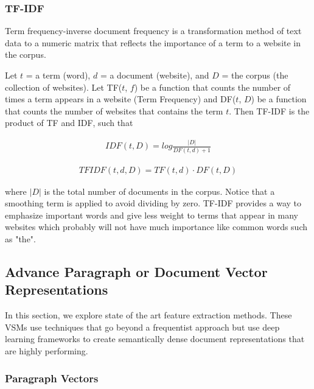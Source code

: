 \documentclass[12pt]{article}
\begin{document}
\subsubsection{TF-IDF} 
\label{TF-IDF}
Term frequency-inverse document frequency is a transformation method of text data to a numeric matrix that reflects the importance of a term to a website in the corpus. 

Let $t$ = a term (word), $d$ = a document (website), and $D$ = the corpus (the collection of websites). Let TF($t$, $f$) be a function that counts the number of times a term appears in a website (Term Frequency) and DF($t$, $D$) be a function that counts the number of websites that contains the term $t$. Then TF-IDF is the product of TF and IDF, such that

\begin{equation*}\label{eq:pareto mle2}
\begin{multlined}
IDF(t,D) = log \frac{|D|}{DF(t, d) + 1}
\end{multlined}
\end{equation*}

\begin{equation*}\label{eq:pareto mle2}
\begin{multlined}
TFIDF(t, d, D) = TF(t, d) \cdot DF(t, D)
\end{multlined}
\end{equation*}

where $|D|$ is the total number of documents in the corpus. Notice that a smoothing term is applied to avoid dividing by zero. TF-IDF provides a way to emphasize important words and give less weight to terms that appear in many websites which probably will not have much importance like common words such as "the".

\begin{center}
\subsection{Advance Paragraph or Document Vector Representations}
\end{center}

In this section, we explore state of the art feature extraction methods. These VSMs use techniques that go beyond a frequentist approach but use deep learning frameworks to create semantically dense document representations that are highly performing. 

\subsubsection{Paragraph Vectors}
\end{document}
